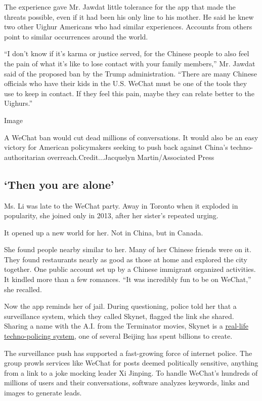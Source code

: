 The experience gave Mr. Jawdat little tolerance for the app that made
the threats possible, even if it had been his only line to his mother.
He said he knew two other Uighur Americans who had similar experiences.
Accounts from others point to similar occurrences around the world.

``I don't know if it's karma or justice served, for the Chinese people
to also feel the pain of what it's like to lose contact with your family
members,'' Mr. Jawdat said of the proposed ban by the Trump
administration. ``There are many Chinese officials who have their kids
in the U.S. WeChat must be one of the tools they use to keep in contact.
If they feel this pain, maybe they can relate better to the Uighurs.''

Image

A WeChat ban would cut dead millions of conversations. It would also be
an easy victory for American policymakers seeking to push back against
China's techno-authoritarian overreach.Credit...Jacquelyn
Martin/Associated Press

\hypertarget{then-you-are-alone}{%
\subsection{`Then you are alone'}\label{then-you-are-alone}}

Ms. Li was late to the WeChat party. Away in Toronto when it exploded in
popularity, she joined only in 2013, after her sister's repeated urging.

It opened up a new world for her. Not in China, but in Canada.

She found people nearby similar to her. Many of her Chinese friends were
on it. They found restaurants nearly as good as those at home and
explored the city together. One public account set up by a Chinese
immigrant organized activities. It kindled more than a few romances.
``It was incredibly fun to be on WeChat,'' she recalled.

Now the app reminds her of jail. During questioning, police told her
that a surveillance system, which they called Skynet, flagged the link
she shared. Sharing a name with the A.I. from the Terminator movies,
Skynet is a
\href{https://www.nytimes3xbfgragh.onion/2019/04/14/technology/china-surveillance-artificial-intelligence-racial-profiling.html}{real-life
techno-policing system}, one of several Beijing has spent billions to
create.

The surveillance push has supported a fast-growing force of internet
police. The group prowls services like WeChat for posts deemed
politically sensitive, anything from a link to a joke mocking leader Xi
Jinping. To handle WeChat's hundreds of millions of users and their
conversations, software analyzes keywords, links and images to generate
leads.

